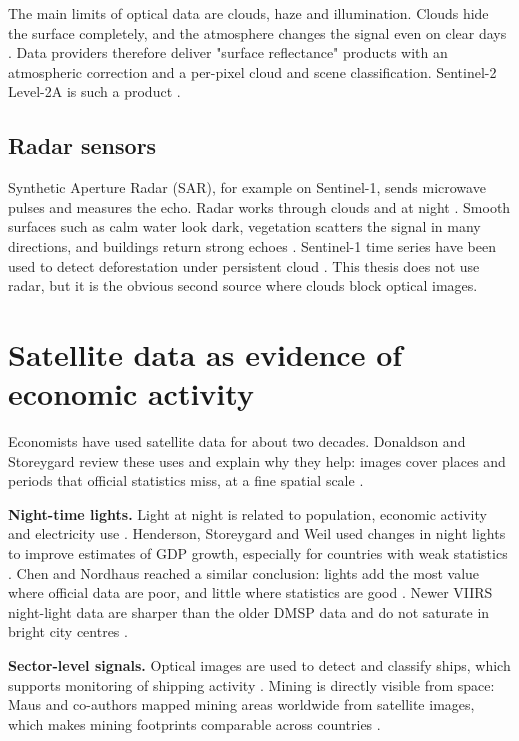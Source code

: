 The main limits of optical data are clouds, haze and illumination. Clouds hide the surface completely, and the atmosphere changes the signal even on clear days \cite{R201}. Data providers therefore deliver "surface reflectance" products with an atmospheric correction and a per-pixel cloud and scene classification. Sentinel-2 Level-2A is such a product \cite{R262}.

\subsection{Radar sensors}

Synthetic Aperture Radar (SAR), for example on Sentinel-1, sends microwave pulses and measures the echo. Radar works through clouds and at night \cite{R220, R221}. Smooth surfaces such as calm water look dark, vegetation scatters the signal in many directions, and buildings return strong echoes \cite{R220}. Sentinel-1 time series have been used to detect deforestation under persistent cloud \cite{R225}. This thesis does not use radar, but it is the obvious second source where clouds block optical images.

\section{Satellite data as evidence of economic activity}

Economists have used satellite data for about two decades. Donaldson and Storeygard review these uses and explain why they help: images cover places and periods that official statistics miss, at a fine spatial scale \cite{R226}.

\textbf{Night-time lights.} Light at night is related to population, economic activity and electricity use \cite{R228}. Henderson, Storeygard and Weil used changes in night lights to improve estimates of GDP growth, especially for countries with weak statistics \cite{R227}. Chen and Nordhaus reached a similar conclusion: lights add the most value where official data are poor, and little where statistics are good \cite{R229}. Newer VIIRS night-light data are sharper than the older DMSP data and do not saturate in bright city centres \cite{R230}.

\textbf{Sector-level signals.} Optical images are used to detect and classify ships, which supports monitoring of shipping activity \cite{R233}. Mining is directly visible from space: Maus and co-authors mapped mining areas worldwide from satellite images, which makes mining footprints comparable across countries \cite{R235}.

